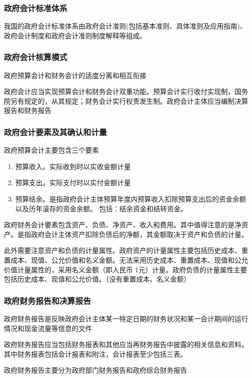 \documentclass[UTF8,12pt]{ctexart}
\numberwithin{equation}{section} %
\numberwithin{figure}{section}
\numberwithin{table}{section}
\begin{document}
	\subsubsection{政府会计标准体系}
	我国的政府会计标准体系由政府会计准则(包括基本准则、具体准则及应用指南)、政府会计制度和政府会计准则制度解释等组成。
	\subsubsection{政府会计核算模式}
	政府预算会计和财务会计的适度分离和相互衔接
	
	政府会计应当实现预算会计和财务会计双重功能。预算会计实行收付实现制，国务院另有规定的，从其规定；财务会计实行权责发生制。政府会计主体应当编制决算报告和财务报告
	\subsubsection{政府会计要素及其确认和计量}
	政府预算会计主要包含三个要素
	\begin{enumerate}
		\item 预算收入。实际收到时以实收金额计量
		
		\item 预算支出。实际支付时以实付金额计量
		
		\item 预算结余。是指政府会计主体预算年度内预算收入扣除预算支出后的资金余额以及历年滚存的资金余额。
		包括：结余资金和结转资金。
	\end{enumerate}
	
	政府财务会计要素包含资产、负债、净资产、收入和费用。其中值得注意的是净资产。是指政府会计主体资产扣除负债后的净额，其金额取决于资产和负债的计量。
	
	此外需要注意资产和负债的计量属性。政府资产的计量属性主要包括历史成本、重置成本、现值、公允价值和名义金额。无法采用历史成本、重置成本、现值和公允价值计量属性的，采用名义金额（即人民币 1元）计量。政府负债的计量属性主要包括历史成本、现值和公允价值。（没有重置成本、名义金额）
	
	\subsubsection{政府财务报告和决算报告}
	政府财务报告是反映政府会计主体某一特定日期的财务状况和某一会计期间的运行情况和现金流量等信息的文件
	
	政府财务报告应当包括财务报表和其他应当再财务报告中披露的相关信息和资料。其中财务报表包括会计报表和附注，会计报表至少包括三表。
	
	政府财务报告主要分为政府部门财务报告和政府综合财务报告
	
\end{document}
